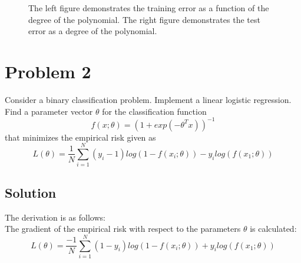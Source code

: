 \documentclass{article}
\begin{document}
\begin{figure}
\begin{minipage}{.6\textwidth}
\end{minipage}
\vspace{-0.425cm}
\caption{The left figure demonstrates the training error as a function of the degree of the polynomial. The right figure demonstrates the test error as a degree of the polynomial. }
\label{fig:model+demo}
\end{figure}


\section{Problem 2}
Consider a binary classification problem. Implement a linear logistic regression. Find a parameter vector $\theta$ for the classification function
\begin{equation}
    f(x;\theta) = (1 + exp(-\theta ^{T} x))^{-1}
\end{equation}
that minimizes the empirical risk given as 
\begin{equation}
\label{eq:loss}
    L(\theta) = \frac{1}{N}\sum_{i=1}^{N}(y_i -1 )log(1-f(x_i;\theta))- y_i log(f(x_1;\theta))
\end{equation}

\subsection{Solution}
The derivation is as follows:
\\
The gradient of the empirical risk with respect to the parameters $\theta$ is calculated:\\
\begin{equation}
    L(\theta) = \frac{-1}{N}\sum_{i=1}^{N}(1-y_i )log(1-f(x_i;\theta)) + y_i log(f(x_1;\theta))
\end{equation}
\end{document}
